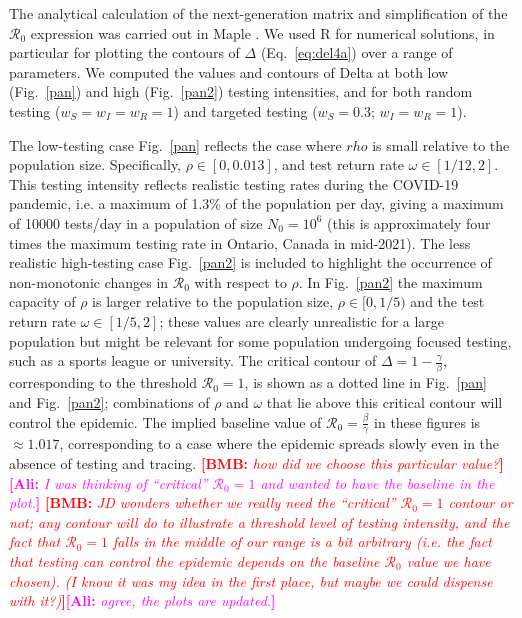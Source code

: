 \documentclass[12pt]{article}
\newcommand{\fref}[1]{Fig.~\ref{#1}}
\newcommand{\Rnum}{\ensuremath{\mathcal{R}_0}\xspace}
\newcommand{\covid}{COVID-19\xspace}
\DeclareRobustCommand\_{\ifmmode\expandafter\subtxt\else\textunderscore\fi}
\newcommand{\comment}{\showcomment}
\newcommand{\showcomment}[3]{\textcolor{#1}{\textbf{[#2: }\textsl{#3}\textbf{]}}}
\newcommand{\ali}[1]{\comment{magenta}{Ali}{#1}}
\newcommand{\bmb}[1]{\comment{red}{BMB}{#1}}
\theoremstyle{definition} %
\begin{document}
The analytical calculation of the next-generation matrix and simplification of the $\Rnum$ expression was carried out in Maple \citep{maple14}. We used R \citep{r} for numerical solutions, in particular for plotting the contours of $\Delta$ (Eq.~\eqref{eq:del4a}) over a range of parameters.
We computed the values and contours of Delta at both low (\fref{pan}) and high (\fref{pan2}) testing intensities, and for both random testing ($w_S=w_I=w_R=1$) and targeted testing ($w_S=0.3$; $w_I=w_R=1$).

The low-testing case \fref{pan} reflects the case where $rho$ is small relative to the population size. Specifically, $\rho \in [0,0.013]$, and test return rate $\omega\in [1/12,2]$. This testing intensity reflects realistic testing rates during the \covid pandemic, i.e. a maximum of 1.3\% of the population per day, giving a maximum of 10000 tests/day in a population of size $N_0=10^6$ (this is approximately four times the maximum testing rate in Ontario, Canada in mid-2021). The less realistic high-testing case \fref{pan2} is included to highlight the occurrence of non-monotonic changes in $\Rnum$ with respect to $\rho$.
In \fref{pan2} the maximum capacity of $\rho$ is larger relative to the population size, $\rho \in [0,1/5)$ and the test return rate $\omega\in [1/5,2]$; these values are clearly unrealistic for a large population but might be relevant for some population undergoing focused testing, such as a sports league or university.
  The critical contour of $\Delta=1-\frac{\gamma}{\beta}$, corresponding to the threshold $\Rnum=1$, is shown as a dotted line in \fref{pan} and \fref{pan2}; combinations of $\rho$ and $\omega$ that lie above this critical contour will control the epidemic. The implied baseline value of $\Rnum=\frac{\beta}{\gamma}$ in these figures is $\approx 1.017$, corresponding to a case where the epidemic spreads slowly even in the absence of testing and tracing. \bmb{how did we choose this particular value?}\ali{I was thinking of ``critical'' $\Rnum=1$ and wanted to have the baseline in the plot.}
  \bmb{JD wonders whether we really need the ``critical'' $\Rnum=1$ contour or not; any contour will do to illustrate a threshold level of testing intensity, and the fact that $\Rnum=1$ falls in the middle of our range is a bit arbitrary (i.e. the fact that testing can control the epidemic depends on the baseline $\Rnum$ value we have chosen). (I know it was my idea in the first place, but maybe we could dispense with it?)}\ali{agree, the plots are updated.}

\end{document}
